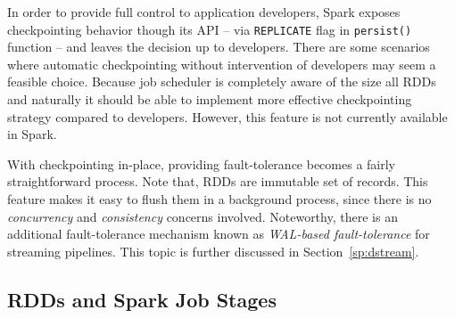 In order to provide full control to application developers, Spark exposes checkpointing behavior though its API -- via \lstinline$REPLICATE$ flag in \lstinline$persist()$ function -- and leaves the decision up to developers. There are some scenarios where automatic checkpointing without intervention of developers may seem a feasible choice. Because job scheduler is completely aware of the size all RDDs and naturally it should be able to implement more effective checkpointing strategy compared to developers. However, this feature is not currently available in Spark.

With checkpointing in-place, providing fault-tolerance becomes a fairly straightforward process. Note that, RDDs are immutable set of records. This feature makes it easy to flush them in a background process, since there is no \emph{concurrency} and \emph{consistency} concerns involved. Noteworthy, there is an additional fault-tolerance mechanism known as \emph{WAL-based fault-tolerance} for streaming pipelines. This topic is further discussed in Section~\ref{sp:dstream}.
\subsection{RDDs and Spark Job Stages}
\label{sp:stage}

